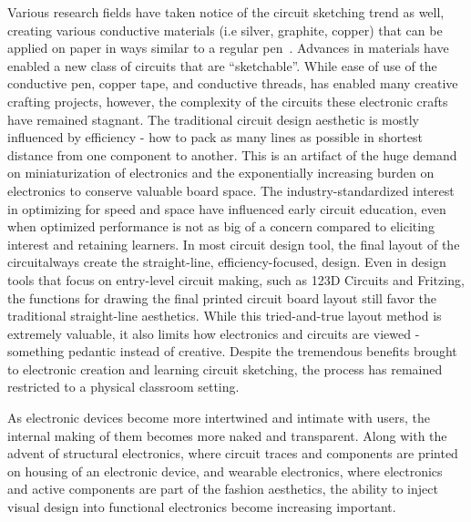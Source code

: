 \documentclass{sigchi}
\begin{document}
Various research fields have taken notice of the circuit sketching trend as well, creating various conductive materials (i.e silver, graphite, copper) that can be applied on paper in ways similar to a regular pen~\cite{russo2011pen}. Advances in materials have enabled a new class of circuits that are ``sketchable''. While ease of use of the conductive pen, copper tape, and conductive threads, has enabled many creative crafting projects, however, the complexity of the circuits these electronic crafts have remained stagnant. The traditional circuit design aesthetic is mostly influenced by efficiency - how to pack as many lines as possible in shortest distance from one component to another. This is an artifact of the huge demand on miniaturization of electronics and the exponentially increasing burden on electronics to conserve valuable board space. The industry-standardized interest in optimizing for speed and space have influenced early circuit education, even when optimized performance is not as big of a concern compared to eliciting interest and retaining learners.
In most circuit design tool, the final layout of the circuitalways create the straight-line, efficiency-focused, design.
Even in design tools that focus on entry-level circuit making, such as 123D Circuits and Fritzing, the functions for drawing the final printed circuit board layout still favor the traditional straight-line aesthetics.
While this tried-and-true layout method is extremely valuable, it also limits how electronics and circuits are viewed - something pedantic instead of creative. Despite the tremendous benefits brought to electronic creation and learning circuit sketching, the process has remained restricted to a physical classroom setting.


As electronic devices become more intertwined and intimate with users, the internal making of them becomes more naked and transparent. Along with the advent of structural electronics, where circuit traces and components are printed on housing of an electronic device, and wearable electronics, where electronics and active components are part of the fashion aesthetics, the ability to inject visual design into functional electronics become increasing important.
\end{document}
